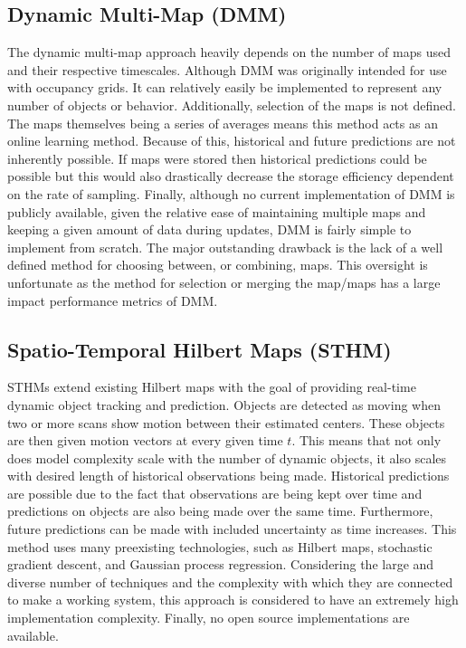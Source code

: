   \subsection { Dynamic Multi-Map (DMM) \cite{Biber2005}}
  The dynamic multi-map approach heavily depends on the number of maps used and their
  respective timescales. Although DMM was originally intended for use with
  occupancy grids. It can relatively easily be implemented to represent any
  number of objects or behavior. Additionally, selection of the maps is not
  defined. The maps themselves being a series of averages means this method acts as
  an online learning method. Because of this, historical and future predictions
  are not inherently possible. If maps were stored then historical predictions
  could be possible but this would also drastically decrease the storage
  efficiency dependent on the rate of sampling. Finally, although no current
  implementation of DMM is publicly available, given the relative ease of
  maintaining multiple maps and keeping a given amount of data during updates,
  DMM is fairly simple to implement from scratch. The major outstanding drawback
  is the lack of a well defined method for choosing between, or combining, maps.
  This oversight is unfortunate as the method for selection or merging the
  map/maps has a large impact performance metrics of DMM. \\

  \subsection{ Spatio-Temporal Hilbert Maps (STHM) \cite{Senanayake2016}}
  STHMs extend existing Hilbert maps with the goal of providing real-time
  dynamic object tracking and prediction. Objects are detected as moving when
  two or more scans show motion between their estimated centers. These objects
  are then given motion vectors at every given time $t$. This means that not
  only does model complexity scale with the number of dynamic objects, it also
  scales with desired length of historical observations being made.
  Historical predictions are possible due to the
  fact that observations are being kept over time and predictions on objects
  are also being made over the same time.
  Furthermore, future predictions can be made with included uncertainty as
  time increases. This method uses many preexisting technologies, such
  as Hilbert maps, stochastic gradient descent, and Gaussian process regression.
  Considering the large and diverse number of techniques and the complexity with
  which they are connected to make a working system, this approach is considered
  to have an extremely high implementation complexity. Finally, no open
  source implementations are available. \\

